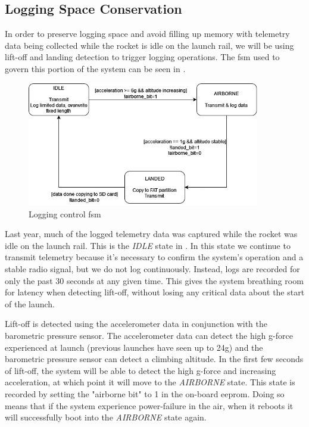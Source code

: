\subsection{Logging Space Conservation}

In order to preserve logging space and avoid filling up memory with telemetry data being collected while the rocket is
idle on the launch rail, we will be using lift-off and landing detection to trigger logging operations. The \gls{fsm}
used to govern this portion of the system can be seen in .

\begin{figure}[H]
    \centering
    \includegraphics[width=4in]{./assets/diagrams/Flight State FSM.png}
    \caption{Logging control \gls{fsm}}
    \label{fig:logging-fsm}
\end{figure}

Last year, much of the logged telemetry data was captured while the rocket was idle on the launch rail. This is the
\textit{IDLE} state in . In this state we continue to transmit telemetry because it's necessary
to confirm the system's operation and a stable radio signal, but we do not log continuously. Instead, logs are recorded
for only the past 30 seconds at any given time. This gives the system breathing room for latency when detecting
lift-off, without losing any critical data about the start of the launch.

Lift-off is detected using the accelerometer data in conjunction with the barometric pressure sensor. The accelerometer
data can detect the high g-force experienced at launch (previous launches have seen up to 24g) and the barometric
pressure sensor can detect a climbing altitude. In the first few seconds of lift-off, the system will be able to detect
the high g-force and increasing acceleration, at which point it will move to the \textit{AIRBORNE} state. This state is
recorded by setting the "airborne bit" to 1 in the on-board \gls{eeprom}. Doing so means that if the system experience
power-failure in the air, when it reboots it will successfully boot into the \textit{AIRBORNE} state again.

